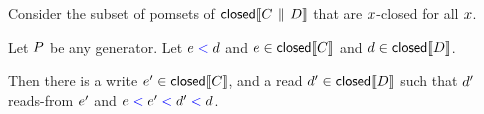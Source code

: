 \begin{lemma}\label{pargen}
Consider the subset of pomsets of $\textsf{closed}\llbracket C \,\mathbin{\|}\, D\rrbracket$ that are  $x$-closed for all $x$.  

Let $P$  be any generator.  
 Let $e\mathrel{{\color{blue}<}}d$ and $e \in \textsf{closed}\llbracket C\rrbracket$ and  $d \in \textsf{closed}\llbracket D\rrbracket $.
  
Then there is a write  $e' \in \textsf{closed}\llbracket C\rrbracket$, and  a read $d' \in \textsf{closed}\llbracket D\rrbracket$ such that  $d'$ reads-from $e'$ and $e \mathrel{{\color{blue}<}} e' \mathrel{{\color{blue}<}} d' \mathrel{{\color{blue}<}} d$. 




\end{lemma}








